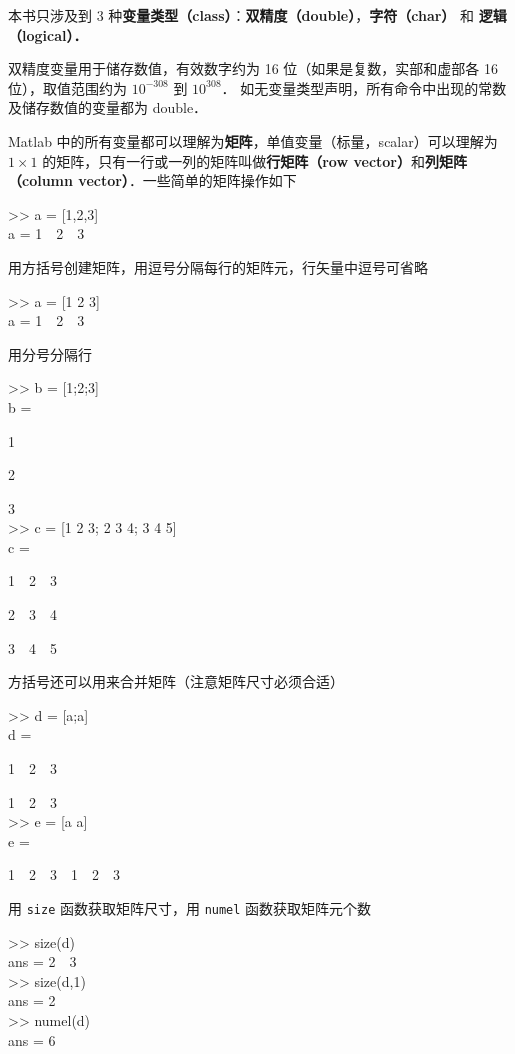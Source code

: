本书只涉及到 3 种\textbf{变量类型（class）}：\textbf{双精度（double）}，\textbf{字符（char）} 和 \textbf{逻辑（logical）．}

双精度变量用于储存数值，有效数字约为 16 位（如果是复数，实部和虚部各 16 位），取值范围约为 $10^{-308}$ 到 $10^{308}$． 如无变量类型声明，所有命令中出现的常数及储存数值的变量都为 double．

Matlab 中的所有变量都可以理解为\textbf{矩阵}，单值变量（标量，scalar）可以理解为 $1\times 1$ 的矩阵，只有一行或一列的矩阵叫做\textbf{行矩阵（row vector）}和\textbf{列矩阵（column vector）}．一些简单的矩阵操作如下
\begin{Command}
>> a = [1,2,3] \\
a = 1\ \ 2\ \ 3
\end{Command}
用方括号创建矩阵，用逗号分隔每行的矩阵元，行矢量中逗号可省略
\begin{Command}
>> a = [1 2 3] \\
a = 1\ \ 2\ \ 3
\end{Command}
用分号分隔行
\begin{Command}
>> b = [1;2;3] \\
b = \par
1 \par
2 \par
3 \\
>> c = [1 2 3; 2 3 4; 3 4 5]\\
c = \par
1\ \ 2\ \ 3 \par
2\ \ 3\ \ 4 \par
3\ \ 4\ \ 5
\end{Command}
方括号还可以用来合并矩阵（注意矩阵尺寸必须合适）
\begin{Command}
>> d = [a;a] \\
d = \par
1\ \ 2\ \ 3 \par
1\ \ 2\ \ 3 \\
>> e = [a a] \\
e = \par
1\ \ 2\ \ 3\ \ 1\ \ 2\ \ 3
\end{Command}
用 \texttt{size} 函数获取矩阵尺寸，用 \texttt{numel} 函数获取矩阵元个数
\begin{Command}
>> size(d) \\
ans = 2\ \ 3 \\
>> size(d,1) \\
ans = 2 \\
>> numel(d) \\
ans = 6
\end{Command}
